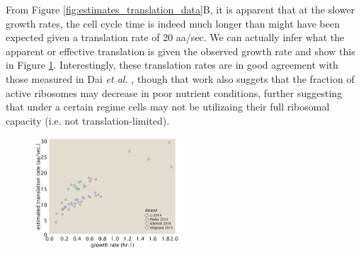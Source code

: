 \documentclass[11pt, letterpaper]{article}
\begin{document}
From Figure \ref{fig:estimates_translation_data}B, it is apparent that at the
slower growth rates, the cell cycle time is indeed much longer than might have
been expected given a translation rate of 20 aa/sec. We can actually infer what
the apparent or effective translation is given the observed growth rate and show
this in Figure \ref{fig:estimates_translation_rate}.  Interestingly, these
translation rates are in good agreement with those measured in Dai {\it et al.} \cite{Dai2016},
though that work also suggets that the fraction of active ribosomes may decrease
in poor nutrient conditions, further suggesting that under a certain regime
cells may not be utilizaing their full ribosomal capacity (i.e. not
translation-limited).



\begin{figure}[H]
		\centering
    \includegraphics[width=0.5\textwidth]{../../code/figures/SI/estimates_translation_translation_rate.pdf}
  \caption{}
  \label{fig:estimates_translation_rate}
\end{figure}



\end{document}
